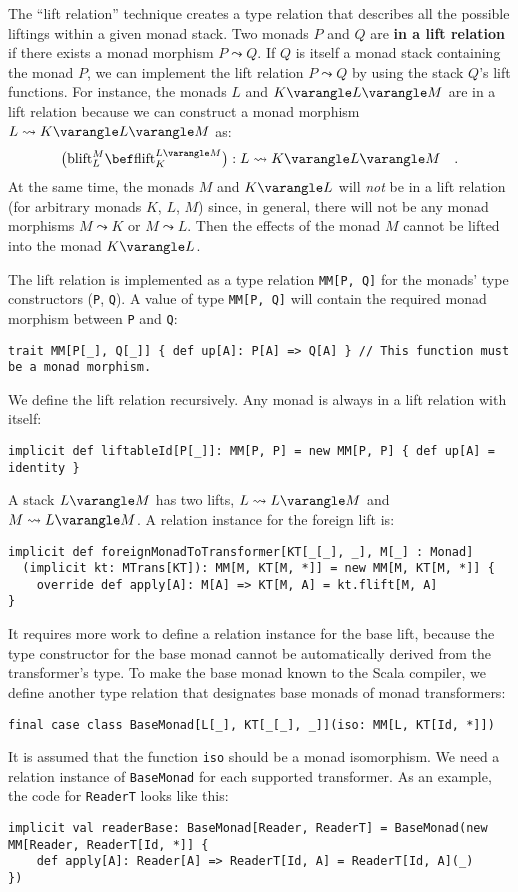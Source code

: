 The \textsf{``}lift
relation\textsf{''} technique creates a type relation
that describes all the possible liftings within a given monad stack.
Two monads $P$ and $Q$ are \textbf{in a lift relation} if there
exists a monad morphism $P\leadsto Q$. If $Q$ is itself a monad
stack containing the monad $P$, we can implement the lift relation
$P\leadsto Q$ by using the stack $Q$\textsf{'}s lift functions. For instance,
the monads $L$ and $K\varangle L\varangle M$ are in a lift relation
because we can construct a monad morphism $L\leadsto K\varangle L\varangle M$
as:
\[
\big(\text{blift}_{L}^{M}\bef\text{flift}_{K}^{L\varangle M}\big):L\leadsto K\varangle L\varangle M\quad.
\]
At the same time, the monads $M$ and $K\varangle L$ will \emph{not}
be in a lift relation (for arbitrary monads $K$, $L$, $M$) since,
in general, there will not be any monad morphisms $M\leadsto K$ or
$M\leadsto L$. Then the effects of the monad $M$ cannot be lifted
into the monad $K\varangle L$.

The lift relation is implemented as a type relation \lstinline!MM[P, Q]!
for the monads\textsf{'} type constructors (\lstinline!P!, \lstinline!Q!).
A value of type \lstinline!MM[P, Q]! will contain the required monad
morphism between \lstinline!P! and \lstinline!Q!:
\begin{lstlisting}
trait MM[P[_], Q[_]] { def up[A]: P[A] => Q[A] } // This function must be a monad morphism.
\end{lstlisting}
We define the lift relation recursively. Any monad is always in a
lift relation with itself:
\begin{lstlisting}
implicit def liftableId[P[_]]: MM[P, P] = new MM[P, P] { def up[A] = identity }
\end{lstlisting}
A stack $L\varangle M$ has two lifts, $L\leadsto L\varangle M$ and
$M\leadsto L\varangle M$. A relation instance for the foreign lift
is:
\begin{lstlisting}
implicit def foreignMonadToTransformer[KT[_[_], _], M[_] : Monad]
  (implicit kt: MTrans[KT]): MM[M, KT[M, *]] = new MM[M, KT[M, *]] {
    override def apply[A]: M[A] => KT[M, A] = kt.flift[M, A]
}
\end{lstlisting}
It requires more work to define a relation instance for the base lift,
because the type constructor for the base monad cannot be automatically
derived from the transformer\textsf{'}s type. To make the base monad known
to the Scala compiler, we define another type relation that designates
base monads of monad transformers:
\begin{lstlisting}
final case class BaseMonad[L[_], KT[_[_], _]](iso: MM[L, KT[Id, *]])
\end{lstlisting}
It is assumed that the function \lstinline!iso! should be a monad
isomorphism. We need a relation instance of \lstinline!BaseMonad!
for each supported transformer. As an example, the code for \lstinline!ReaderT!
looks like this:
\begin{lstlisting}
implicit val readerBase: BaseMonad[Reader, ReaderT] = BaseMonad(new MM[Reader, ReaderT[Id, *]] {
    def apply[A]: Reader[A] => ReaderT[Id, A] = ReaderT[Id, A](_)
})
\end{lstlisting}

